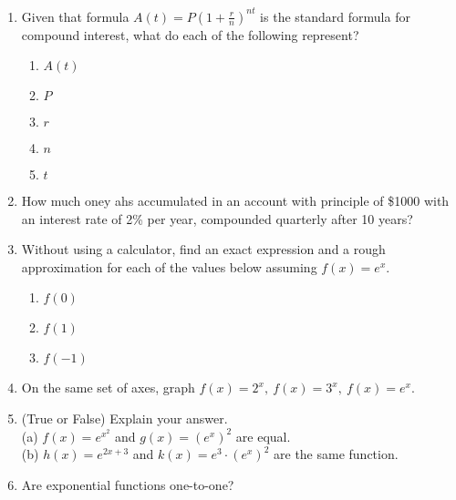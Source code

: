 \documentclass[11pt]{article}
\begin{document}
\begin{enumerate}
\item Given that formula $A(t)=P(1+\frac{r}{n})^{nt}$ is the standard formula for compound interest, 
what do each of the following represent?
\begin{enumerate}
\item $A(t)$
\item $P$
\item $r$
\item $n$
\item $t$
\end{enumerate}
\item How much oney ahs accumulated in an account with principle of \$1000 with an interest rate of 2\% per year, compounded quarterly after 10 years?
\vfill
\newpage
\item Without using a calculator, find an exact expression and a rough approximation for each of the values below assuming $f(x)=e^x.$
\begin{enumerate}
\item $f(0)$
\item $f(1)$
\item $f(-1)$
\end{enumerate}
\item On the same set of axes, graph $f(x)=2^x,\:f(x)=3^x,\: f(x)=e^x.$
\vfill
\item (True or False) Explain your answer.\\ (a) $f(x)=e^{x^2}$ and $g(x)=(e^x)^2$ are equal. \\(b) $h(x)=e^{2x+3}$ and $k(x)=e^3\cdot (e^x)^2$ are the same function. 
\vfill
\item Are exponential functions one-to-one?

\end{enumerate}
\end{document}
